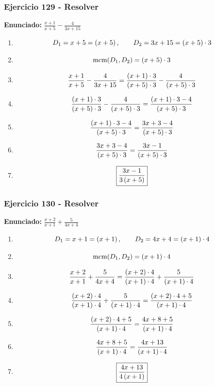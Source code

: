 \documentclass[11pt,a4paper]{article}
\newcommand{\fitmath}[1]{%
\[
\setbox0=\hbox{$\displaystyle #1$}%
\ifdim\wd0>\linewidth
\resizebox{\linewidth}{!}{$\displaystyle #1$}%
\else
#1%
\fi
\]
}
\begin{document}
\vspace{0.12cm}
\subsubsection*{Ejercicio 129 - Resolver}
\textbf{Enunciado:} $ \frac{x + 1}{x + 5} - \frac{4}{3 x + 15} $\par
\begin{enumerate}[leftmargin=2em]
\item \fitmath{D_1=x + 5=\left(x + 5\right),\qquad D_2=3 x + 15=\left(x + 5\right)\cdot 3}
\item \fitmath{\operatorname{mcm}(D_1,D_2)=\left(x + 5\right)\cdot 3}
\item \fitmath{\frac{x + 1}{x + 5} - \frac{4}{3 x + 15}= \frac{\left(x + 1\right)\cdot 3}{\left(x + 5\right)\cdot 3} - \frac{4}{\left(x + 5\right)\cdot 3}}
\item \fitmath{\frac{\left(x + 1\right)\cdot 3}{\left(x + 5\right)\cdot 3} - \frac{4}{\left(x + 5\right)\cdot 3}=\frac{\left(x + 1\right)\cdot 3 - 4}{\left(x + 5\right)\cdot 3}}
\item \fitmath{\frac{\left(x + 1\right)\cdot 3 - 4}{\left(x + 5\right)\cdot 3}=\frac{3 x + 3 - 4}{\left(x + 5\right)\cdot 3}}
\item \fitmath{\frac{3 x + 3 - 4}{\left(x + 5\right)\cdot 3}=\frac{3 x - 1}{\left(x + 5\right)\cdot 3}}
\item \fitmath{\boxed{\frac{3 x - 1}{3 \left(x + 5\right)}}}
\end{enumerate}

\vspace{0.12cm}
\subsubsection*{Ejercicio 130 - Resolver}
\textbf{Enunciado:} $ \frac{x + 2}{x + 1} + \frac{5}{4 x + 4} $\par
\begin{enumerate}[leftmargin=2em]
\item \fitmath{D_1=x + 1=\left(x + 1\right),\qquad D_2=4 x + 4=\left(x + 1\right)\cdot 4}
\item \fitmath{\operatorname{mcm}(D_1,D_2)=\left(x + 1\right)\cdot 4}
\item \fitmath{\frac{x + 2}{x + 1} + \frac{5}{4 x + 4}= \frac{\left(x + 2\right)\cdot 4}{\left(x + 1\right)\cdot 4} + \frac{5}{\left(x + 1\right)\cdot 4}}
\item \fitmath{\frac{\left(x + 2\right)\cdot 4}{\left(x + 1\right)\cdot 4} + \frac{5}{\left(x + 1\right)\cdot 4}=\frac{\left(x + 2\right)\cdot 4 + 5}{\left(x + 1\right)\cdot 4}}
\item \fitmath{\frac{\left(x + 2\right)\cdot 4 + 5}{\left(x + 1\right)\cdot 4}=\frac{4 x + 8 + 5}{\left(x + 1\right)\cdot 4}}
\item \fitmath{\frac{4 x + 8 + 5}{\left(x + 1\right)\cdot 4}=\frac{4 x + 13}{\left(x + 1\right)\cdot 4}}
\item \fitmath{\boxed{\frac{4 x + 13}{4 \left(x + 1\right)}}}
\end{enumerate}
\end{document}
